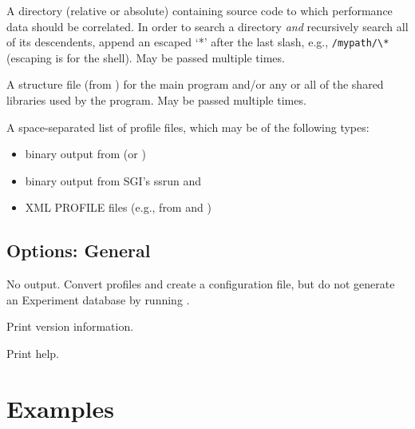 \documentclass[english]{article}
\begin{document}
\begin{Description}
\item[\OptArg{-I}{dir}] A directory (relative or absolute) containing source code to which performance data should be correlated.  In order to search a directory \emph{and} recursively search all of its descendents, append an escaped `*' after the last slash, e.g., \verb+/mypath/\*+ (escaping is for the shell). May be passed multiple times.
\item[\OptArg{-S}{struct-file}] A structure file (from ) for the main program and/or any or all of the shared libraries used by the program.  May be passed multiple times.
\item[\OptArg{-P}{profile-file}] A space-separated list of profile files, which may be of the following types:
\begin{itemize}
  \item binary output from  (or )
  \item binary output from SGI's ssrun and 
  \item XML PROFILE files (e.g., from  and )
\end{itemize}

\end{Description}

\subsection{Options: General}

\begin{Description}
\item[\Opt{-n}] No  output.  Convert profiles and create a configuration file, but do not generate an Experiment database by running .
\item[\Opt{-V}] Print version information.
\item[\Opt{-h}] Print help.
\end{Description}

\section{Examples}
\end{document}
